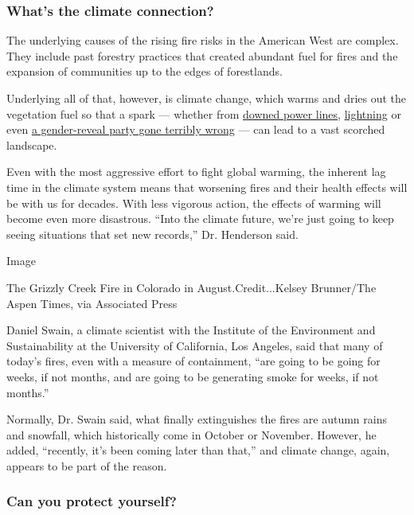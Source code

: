\hypertarget{whats-the-climate-connection}{%
\subsubsection{What's the climate
connection?}\label{whats-the-climate-connection}}

The underlying causes of the rising fire risks in the American West are
complex. They include past forestry practices that created abundant fuel
for fires and the expansion of communities up to the edges of
forestlands.

Underlying all of that, however, is climate change, which warms and
dries out the vegetation fuel so that a spark --- whether from
\href{https://www.nytimes3xbfgragh.onion/interactive/2019/03/18/business/pge-california-wildfires.html}{downed
power lines},
\href{https://www.nytimes3xbfgragh.onion/2020/08/24/us/california-fires.html}{lightning}
or even
\href{https://www.nytimes3xbfgragh.onion/2020/09/07/us/gender-reveal-party-wildfire.html}{a
gender-reveal party gone terribly wrong} --- can lead to a vast scorched
landscape.

Even with the most aggressive effort to fight global warming, the
inherent lag time in the climate system means that worsening fires and
their health effects will be with us for decades. With less vigorous
action, the effects of warming will become even more disastrous. ``Into
the climate future, we're just going to keep seeing situations that set
new records,'' Dr. Henderson said.

Image

The Grizzly Creek Fire in Colorado in August.Credit...Kelsey Brunner/The
Aspen Times, via Associated Press

Daniel Swain, a climate scientist with the Institute of the Environment
and Sustainability at the University of California, Los Angeles, said
that many of today's fires, even with a measure of containment, ``are
going to be going for weeks, if not months, and are going to be
generating smoke for weeks, if not months.''

Normally, Dr. Swain said, what finally extinguishes the fires are autumn
rains and snowfall, which historically come in October or November.
However, he added, ``recently, it's been coming later than that,'' and
climate change, again, appears to be part of the reason.

\hypertarget{can-you-protect-yourself}{%
\subsubsection{Can you protect
yourself?}\label{can-you-protect-yourself}}

